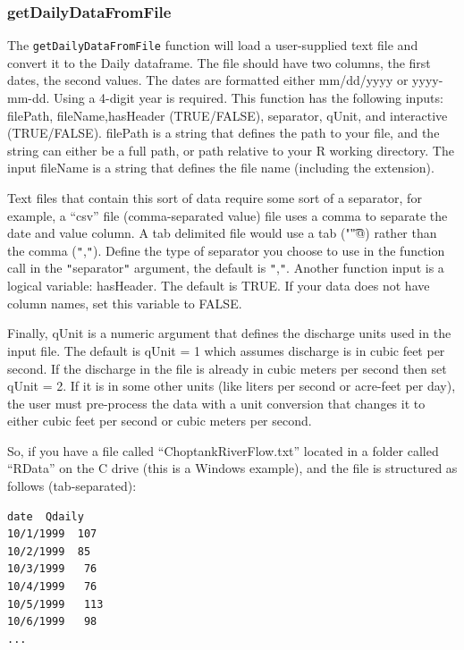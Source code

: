 \documentclass[a4paper,11pt]{article}\usepackage[]{graphicx}\usepackage[]{color}
\begin{document}
\subsubsection{getDailyDataFromFile}
\label{sec:DailyFile}
The \texttt{getDailyDataFromFile} function will load a user-supplied text file and convert it to the Daily dataframe. The file should have two columns, the first dates, the second values.  The dates are formatted either mm/dd/yyyy or yyyy-mm-dd. Using a 4-digit year is required. This function has the following inputs: filePath, fileName,hasHeader (TRUE/FALSE), separator, qUnit, and interactive (TRUE/FALSE). filePath is a string that defines the path to your file, and the string can either be a full path, or path relative to your R working directory. The input fileName is a string that defines the file name (including the extension).

Text files that contain this sort of data require some sort of a separator, for example, a \enquote{csv} file (comma-separated value) file uses a comma to separate the date and value column. A tab delimited file would use a tab (\verb@"\t"@) rather than the comma (\texttt{"},\texttt{"}). Define the type of separator you choose to use in the function call in the \texttt{"}separator\texttt{"} argument, the default is \texttt{"},\texttt{"}. Another function input is a logical variable: hasHeader.  The default is TRUE. If your data does not have column names, set this variable to FALSE.

Finally, qUnit is a numeric argument that defines the discharge units used in the input file.  The default is qUnit = 1 which assumes discharge is in cubic feet per second.  If the discharge in the file is already in cubic meters per second then set qUnit = 2.  If it is in some other units (like liters per second or acre-feet per day), the user must pre-process the data with a unit conversion that changes it to either cubic feet per second or cubic meters per second.

So, if you have a file called \enquote{ChoptankRiverFlow.txt} located in a folder called \enquote{RData} on the C drive (this is a Windows example), and the file is structured as follows (tab-separated):


\singlespacing
\begin{verbatim}
date  Qdaily
10/1/1999  107
10/2/1999  85
10/3/1999	76
10/4/1999	76
10/5/1999	113
10/6/1999	98
...
\end{verbatim}
\doublespacing
\end{document}

